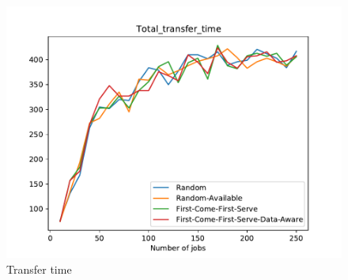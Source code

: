 \documentclass[a4paper]{article}
\begin{document}
\begin{figure}[ht]\includegraphics[scale=1]{MBSS/plot/Total_transfer_time.pdf}\caption{Transfer time}\end{figure}


\printbibliography
\end{document}
